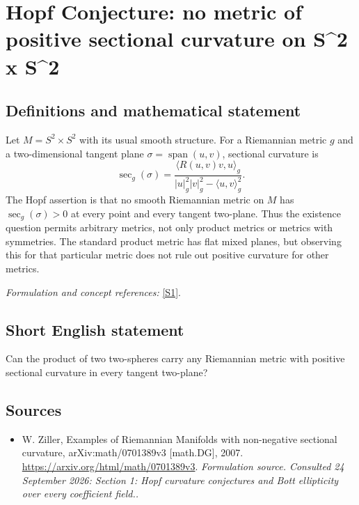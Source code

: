 \documentclass[11pt]{article}
\begin{document}
\section*{\texorpdfstring{Hopf Conjecture: no metric of positive sectional curvature on S\textasciicircum{}2 x S\textasciicircum{}2}{Hopf Conjecture: no metric of positive sectional curvature on S\textasciicircum{}2 x S\textasciicircum{}2}}\label{347}
\subsection{Definitions and mathematical statement}
Let $M=S^2\times S^2$ with its usual smooth structure. For a Riemannian metric $g$ and a two-dimensional tangent plane $\sigma=\operatorname{span}(u,v)$, sectional curvature is
\[
 \sec_g(\sigma)=\frac{\langle R(u,v)v,u\rangle_g}
 {|u|_g^2|v|_g^2-\langle u,v\rangle_g^2}.
\]
The Hopf assertion is that no smooth Riemannian metric on $M$ has $\sec_g(\sigma)>0$ at every point and every tangent two-plane. Thus the existence question permits arbitrary metrics, not only product metrics or metrics with symmetries. The standard product metric has flat mixed planes, but observing this for that particular metric does not rule out positive curvature for other metrics.
\par\smallskip\textit{Formulation and concept references:} \href{https://arxiv.org/html/math/0701389v3}{[S1]}.

\subsection{Short English statement}
Can the product of two two-spheres carry any Riemannian metric with positive sectional curvature in every tangent two-plane?
\subsection{Sources}
\begin{itemize}
\item[S1]W. Ziller, Examples of Riemannian Manifolds with non-negative sectional curvature, arXiv:math/0701389v3 [math.DG], 2007.
\url{https://arxiv.org/html/math/0701389v3}.
\textit{Formulation source. Consulted 24 September 2026: Section 1: Hopf curvature conjectures and Bott ellipticity over every coefficient field..}
\end{itemize}
\end{document}
